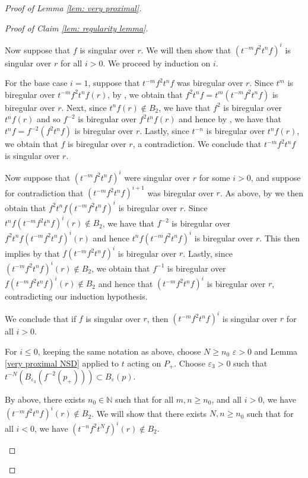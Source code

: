 \documentclass[12pt]{article}
\theoremstyle{definition}
\newcommand{\N}{\mathbb{N}}
\newcommand{\ve}{\varepsilon}
\begin{document}
\begin{proof} [Proof of Lemma \ref{lem: very proximal}]
\begin{proof}[Proof of Claim \ref{lem: regularity lemma}]
\begin{enumerate}
\begin{enumerate}
\begin{enumerate}
    
    Now suppose that $f$ is singular over $r$. We will then show that $(t^{-m}f^2 t^n f)^i$ is singular over $r$ for all $i > 0$. We proceed by induction on $i$. 

    For the base case $i = 1$, suppose that $t^{-m}f^2 t^n f$ was biregular over $r$. Since $t^m$ is biregular over $t^{-m}f^2 t^n f (r)$, by \cite[Remark 4.4]{Algebraic}, we obtain that $f^2 t^n f = t^m (t^{-m}f^2 t^n f)$ is biregular over $r$. Next, since $t^n f (r) \notin B_2$, we have that $f^2$ is biregular over $t^n f (r)$ and so $f^{-2}$ is biregular over $f^2 t^n f (r)$ and hence by \cite[Remark 4.4]{Algebraic}, we have that $t^n f = f^{-2}(f^2 t^n f)$ is biregular over $r$. Lastly, since $t^{-n}$ is biregular over $t^n f(r)$, we obtain that $f$ is biregular over $r$, a contradiction. We conclude that  $t^{-m}f^2 t^n f$ is singular over $r$. 

    Now suppose that $(t^{-m}f^2 t^n f)^i$ were singular over $r$ for some $i > 0$, and suppose for contradiction that $(t^{-m}f^2 t^n f)^{i+1}$ was biregular over $r$. As above, by \cite[Remark 4.4]{Algebraic} we then obtain that $f^2 t^n f (t^{-m}f^2 t^n f)^i$ is biregular over $r$. Since $t^n f (t^{-m}f^2 t^n f)^i (r) \notin B_2$, we have that $f^{-2}$ is biregular over $f^2 t^n f (t^{-m}f^2 t^n f)^i (r)$ and hence $t^n f (t^{-m}f^2 t^n f)^i$ is biregular over $r$. This then implies by \cite[Remark 4.4]{Algebraic} that $f (t^{-m}f^2 t^n f)^i$ is biregular over $r$. Lastly, since $(t^{-m}f^2 t^n f)^i(r) \notin B_2$, we obtain that $f^{-1}$ is biregular over $f(t^{-m}f^2 t^n f)^i(r) \notin B_2$ and hence that $(t^{-m}f^2 t^n f)^i$ is biregular over $r$, contradicting our induction hypothesis. 

    We conclude that if $f$ is singular over $r$, then $(t^{-m}f^2 t^n f)^i$ is singular over $r$ for all $i > 0$. 

    For $i \leq 0$, keeping the same notation as above, choose $N \geq n_0$ $\ve > 0$ and Lemma \ref{very proximal NSD} applied to $t$ acting on $P_+$. Choose $\ve_3 > 0$ such that $t^{-N}(B_{\ve_3}(f^{-2}(p_+))) \subset B_{\ve}(p)$.  

    By above, there exists $n_0 \in \N$ such that for all $m,n \geq n_0$, and all $i > 0$, we have $(t^{-m}f^2 t^n f)^i(r) \notin B_2$. We will show that there exists $N,n \geq n_0$ such that for all $i < 0$, we have $(t^{-n}f^2 t^N f)^i (r) \notin B_2$. 



\end{enumerate}
\end{enumerate}
\end{enumerate}
\end{proof}
\end{proof}
\end{document}

